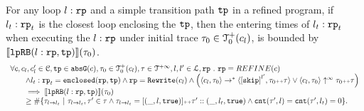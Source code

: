 
\begin{lemma}
  \label{lemma:looprb-sound}
  For any loop $l: \mathtt{rp}$ and a simple transition path $\mathtt{tp}$ in a refined program, if $l_t: \mathtt{rp}_t$ is the closest loop enclosing the $\mathtt{tp}$, then the entering times of $l_t: \mathtt{rp}_t$ when executing the $l: \mathtt{rp}$ under initial trace $\mathtt{\tau}_0 \in \mathcal{T}^{+}_0(c_l)$, is bounded by $\llbracket \mathtt{lpRB}(l: \mathtt{rp}, \mathtt{tp}) \rrbracket(\mathtt{\tau}_0)$.
  \[
    \begin{array}{l}
    \forall c, c_l, c_l' \in \cdom, \tpath \in \absG(c), \trace_0 \in \ftdom_0(c_l), \trace \in \tdom, l, l' \in \ldom, \rprog \st 
    \rprog = REFINE(c)
    \\ \qquad
    \land l_t: \rprog_t = \kw{enclosed}(\rprog, \tpath)
    \land 
    \rprog = \algrewrite(c_l)
    \land
    \Big(
    \config{c_l, \trace_0} \to^* \config{\clabel{\eskip}^{l'}, \trace_0 \tracecat \trace}
    \lor \config{c_l, \trace_0} \uparrow^{\infty} \trace_0 \tracecat \trace 
    \Big)
    \\ \qquad
    \implies
    \econfig{\lpchB(l: \rprog, \tpath)}(\trace_0) 
    \\ \qquad \geq 
    \# \left\{\trace_{l \to l_t} ~\vert~ \trace_{l \to l_t}, \trace' \in \trace \land \trace_{l \to l_t} = [(\_, l, \etrue)] \tracecat \trace' :: (\_, l_t, \etrue)
    \land \counter(\trace', l) = \counter(\trace', l_t) = 0 
    \right\}.
    \end{array}
  \]
  \end{lemma}
